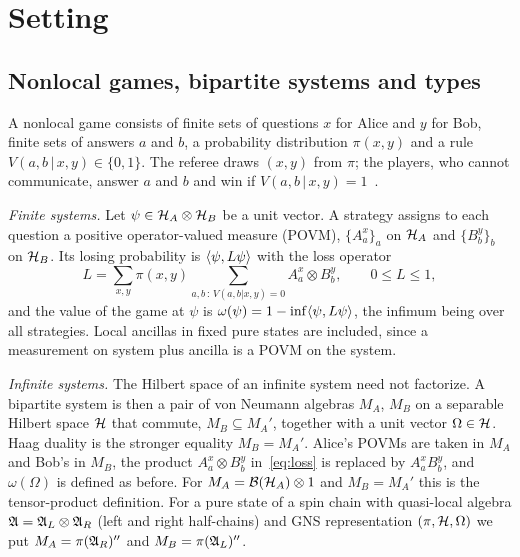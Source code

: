 \section{Setting}\label{sec:setting}

\subsection{Nonlocal games, bipartite systems and types}

A nonlocal game consists of finite sets of questions $x$ for Alice and $y$ for Bob, finite
sets of answers $a$ and $b$, a probability distribution $\pi(x,y)$ and a rule
$V(a,b\,|\,x,y)\in\{0,1\}$. The referee draws $(x,y)$ from $\pi$; the players, who cannot
communicate, answer $a$ and $b$ and win if $V(a,b\,|\,x,y)=1$~\cite{CHTW04,BrunnerRMP}.

\emph{Finite systems.} Let $\psi\in\mathcal{H}_A\otimes\mathcal{H}_B$ be a unit vector. A strategy assigns to
each question a positive operator-valued measure (POVM), $\{A^x_a\}_a$ on $\mathcal{H}_A$ and
$\{B^y_b\}_b$ on $\mathcal{H}_B$. Its losing probability is $\langle \psi,L\psi\rangle$ with the loss operator
\begin{equation}\label{eq:loss}
L=\sum_{x,y}\pi(x,y)\sum_{a,b\,:\,V(a,b|x,y)=0}A^x_a\otimes B^y_b,\qquad 0\le L\le 1 ,
\end{equation}
and the value of the game at $\psi$ is $\omega(\psi)=1-\inf\langle \psi,L\psi\rangle$, the infimum being
over all strategies. Local ancillas in fixed pure states are included, since a measurement on
system plus ancilla is a POVM on the system.

\emph{Infinite systems.} The Hilbert space of an infinite system need not factorize. A bipartite
system is then a pair of von Neumann algebras $M_A$, $M_B$ on a separable Hilbert space $\mathcal{H}$
that commute, $M_B\subseteq M_A'$, together with a unit vector
$\Omega\in\mathcal{H}$. Haag duality is the stronger equality $M_B=M_A'$. Alice's POVMs are taken in $M_A$ and Bob's in $M_B$, the product
$A^x_a\otimes B^y_b$ in~\eqref{eq:loss} is replaced by $A^x_aB^y_b$, and $\omega(\Omega)$ is
defined as before. For $M_A=\mathcal{B}(\mathcal{H}_A)\otimes 1$ and $M_B=M_A'$ this is the tensor-product definition. For a pure
state of a spin chain with quasi-local algebra $\mathfrak{A}=\mathfrak{A}_L\otimes\mathfrak{A}_R$ (left and right
half-chains) and GNS representation $(\pi,\mathcal{H},\Omega)$ we put $M_A=\pi(\mathfrak{A}_R)''$ and
$M_B=\pi(\mathfrak{A}_L)''$.

